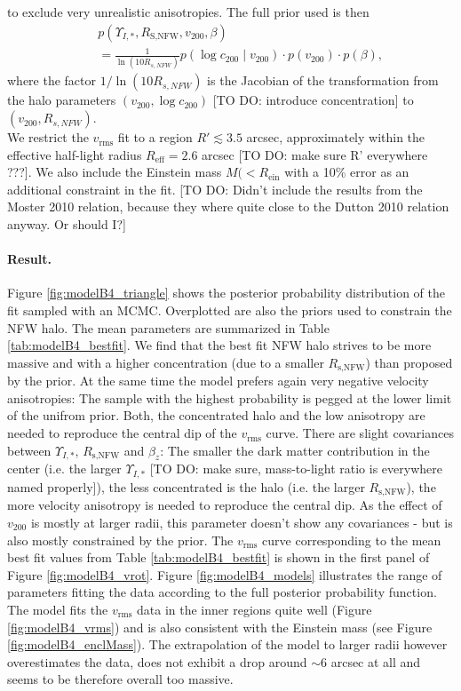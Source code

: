 to exclude very unrealistic anisotropies. The full prior used is then
\begin{eqnarray*}
&&p(\Upsilon_{I,*},R_\text{S,NFW},v_{200},\beta) \\
&&= \frac{1}{\ln\left( 10 R_{s,NFW}\right)} p(\log c_{200} \mid v_{200}) \cdot p(v_{200}) \cdot p(\beta), 
\end{eqnarray*}
where the factor $1/\ln\left( 10 R_{s,NFW}\right)$ is the Jacobian of the transformation from the halo parameters $(v_{200},\log c_{200})$ [TO DO: introduce concentration] to $(v_{200},R_{s,NFW})$.
\\We restrict the $v_\text{rms}$ fit to a region $R' \lesssim 3.5$ arcsec, approximately within the effective half-light radius $R_\text{eff} = 2.6$ arcsec  [TO DO: make sure R' everywhere ???]. We also include the Einstein mass $M(<R_\text{ein}$ with a 10\% error as an additional constraint in the fit. [TO DO: Didn't include the results from the Moster 2010 relation, because they where quite close to the Dutton 2010 relation anyway. Or should I?]


\paragraph{Result.} Figure \ref{fig:modelB4_triangle} shows the posterior probability distribution of the fit sampled with an MCMC. Overplotted are also the priors used to constrain the NFW halo. The mean parameters are summarized in Table \ref{tab:modelB4_bestfit}. We find that the best fit NFW halo strives to be more massive and with a higher concentration (due to a smaller $R_\text{s,NFW}$) than  proposed by the prior. At the same time the model prefers again very negative velocity anisotropies: The sample with the highest probability is pegged at the lower limit of the unifrom prior. Both, the concentrated halo and the low anisotropy are needed to reproduce the central dip of the $v_\text{rms}$ curve. There are slight covariances between $\Upsilon_{I,*}$,  $R_\text{s,NFW}$ and $\beta_z$: The smaller the dark matter contribution in the center (i.e. the larger $\Upsilon_{I,*}$ [TO DO: make sure, mass-to-light ratio is everywhere named properly]), the less concentrated is the halo (i.e. the larger $R_\text{s,NFW}$), the more velocity anisotropy is needed to reproduce the central dip. As the effect of $v_{200}$ is mostly at larger radii, this parameter doesn't show any covariances - but is also mostly constrained by the prior. The $v_\text{rms}$ curve corresponding to the mean best fit values from Table \ref{tab:modelB4_bestfit} is shown in the first panel of Figure \ref{fig:modelB4_vrot}. Figure \ref{fig:modelB4_models} illustrates the range of parameters fitting the data according to the full posterior probability function. The model fits the $v_\text{rms}$ data in the inner regions quite well (Figure \ref{fig:modelB4_vrms}) and is also consistent with the Einstein mass (see Figure \ref{fig:modelB4_enclMass}). The extrapolation of the model to larger radii however overestimates the data, does not exhibit a drop around $\sim 6$ arcsec at all and seems to be therefore overall too massive.\\


